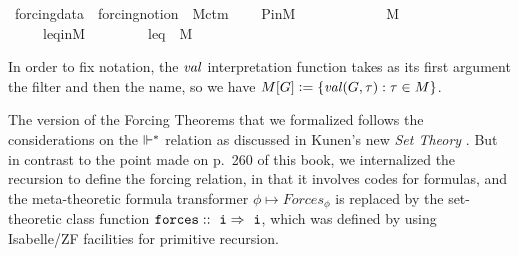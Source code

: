 \begin{isabelle}
\isamarkupfalse%
\ forcing{\isacharunderscore}{\kern0pt}data{}\ {\isacharequal}{\kern0pt}\ forcing{\isacharunderscore}{\kern0pt}notion\ {\isacharplus}{\kern0pt}\ M{\isacharunderscore}{\kern0pt}ctm{}\ {\isacharplus}{\kern0pt}\isanewline
\ \ \ P{\isacharunderscore}{\kern0pt}in{\isacharunderscore}{\kern0pt}M{\isacharcolon}{\kern0pt}\ \ \ \ \ \ \ \ \ \ \ {\isachardoublequoteopen}{\isasymbbbP}\ {\isasymin}\ M{\isachardoublequoteclose}\isanewline
\ \ \ \ \ leq{\isacharunderscore}{\kern0pt}in{\isacharunderscore}{\kern0pt}M{\isacharcolon}{\kern0pt}\ \ \ \ \ \ \ \ \ {\isachardoublequoteopen}leq\ {\isasymin}\ M{\isachardoublequoteclose}
\end{isabelle}
In order to fix notation, the
$\operatorname{\mathit{val}}$ interpretation function takes as its first argument the filter
and then the name, so we have
$M[G]\mathrel{\mathop:}= \{ \operatorname{\mathit{val}}(G,\tau) : \tau\in M \}$.

The version of the Forcing Theorems that we formalized follows the
considerations on the $\Vdash^*$ relation as discussed in Kunen's new
\emph{Set Theory}
\cite[p.~257ff]{kunen2011set}. But in contrast to the point made on
p.~260 of this book, we internalized the recursion to define the forcing relation,
in that it involves codes for formulas, and the meta-theoretic formula
transformer $\phi\mapsto\mathit{Forces}_\phi$ is replaced by the
set-theoretic class function $\forceisa:: \tyi \fun \tyi$, which was defined by using
Isabelle/ZF facilities for primitive recursion.

